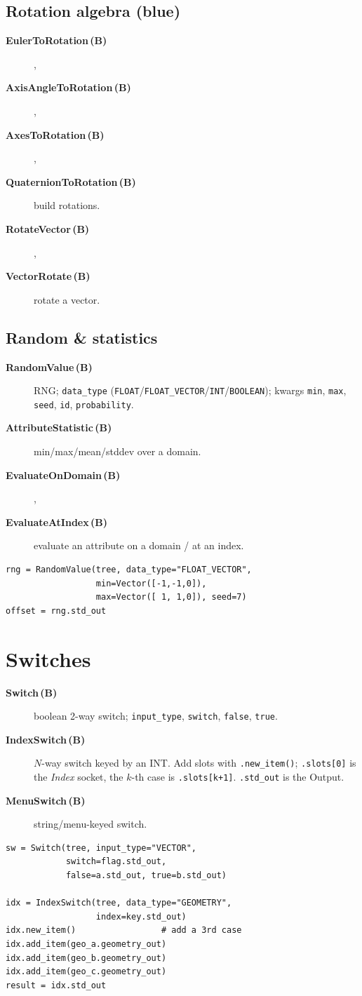 \documentclass[10pt,a4paper,twocolumn]{article}
\newcommand{\code}[1]{\texttt{\small #1}}
\newcommand{\Bn}{\textcolor{bluenode}{\textbf{(B)}}}
\newcommand{\cls}[3]{\item[\textbf{#1}\,#2] #3}
\begin{document}
\subsection{Rotation algebra (blue)}
\begin{description}
\cls{EulerToRotation}{\Bn}, \cls{AxisAngleToRotation}{\Bn},
  \cls{AxesToRotation}{\Bn}, \cls{QuaternionToRotation}{\Bn}{build
  rotations.}
\cls{RotateVector}{\Bn}, \cls{VectorRotate}{\Bn}{rotate a vector.}
\end{description}

\subsection{Random \& statistics}
\begin{description}
\cls{RandomValue}{\Bn}{RNG; \code{data\_type}
  (\code{FLOAT}/\code{FLOAT\_VECTOR}/\code{INT}/\code{BOOLEAN}); kwargs
  \code{min}, \code{max}, \code{seed}, \code{id}, \code{probability}.}
\cls{AttributeStatistic}{\Bn}{min/max/mean/stddev over a domain.}
\cls{EvaluateOnDomain}{\Bn}, \cls{EvaluateAtIndex}{\Bn}{evaluate an
  attribute on a domain / at an index.}
\end{description}

\begin{lstlisting}
rng = RandomValue(tree, data_type="FLOAT_VECTOR",
                  min=Vector([-1,-1,0]),
                  max=Vector([ 1, 1,0]), seed=7)
offset = rng.std_out
\end{lstlisting}

\section{Switches}

\begin{description}
\cls{Switch}{\Bn}{boolean 2-way switch; \code{input\_type}, \code{switch},
  \code{false}, \code{true}.}
\cls{IndexSwitch}{\Bn}{$N$-way switch keyed by an INT. Add slots with
  \code{.new\_item()}; \code{.slots[0]} is the \emph{Index} socket, the
  $k$-th case is \code{.slots[k+1]}. \code{.std\_out} is the Output.}
\cls{MenuSwitch}{\Bn}{string/menu-keyed switch.}
\end{description}

\begin{lstlisting}
sw = Switch(tree, input_type="VECTOR",
            switch=flag.std_out,
            false=a.std_out, true=b.std_out)

idx = IndexSwitch(tree, data_type="GEOMETRY",
                  index=key.std_out)
idx.new_item()                 # add a 3rd case
idx.add_item(geo_a.geometry_out)
idx.add_item(geo_b.geometry_out)
idx.add_item(geo_c.geometry_out)
result = idx.std_out
\end{lstlisting}
\end{document}
